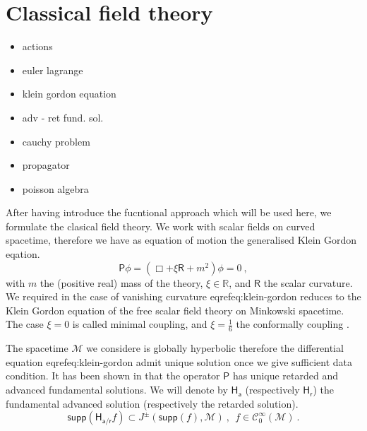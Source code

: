 \documentclass[10pt]{book}
\newcommand{\supp}{\mathsf{supp}}
\newcommand{\Ccal}{\mathcal{C}}
\newcommand{\Mcal}{\mathcal{M}}
\newcommand{\Rbb}{\mathbb{R}}
\newcommand{\Hsf}{\mathsf{H}}
\newcommand{\Psf}{\mathsf{P}}
\newcommand{\Rsf}{\mathsf{R}}
\newcommand{\asf}{\mathsf{a}}
\newcommand{\rsf}{\mathsf{r}}
\theoremstyle{break}
\begin{document}
\section{Classical field theory}

\begin{itemize}
\item actions
\item euler lagrange
\item klein gordon equation
\item adv - ret fund. sol.
\item cauchy problem
\item propagator
\item poisson algebra
\end{itemize}

\vspace*{88pt}


After having introduce the fucntional approach which will be used here, we formulate the clasical field theory. We work with scalar fields on curved spacetime, therefore we have as equation of motion the generalised Klein Gordon eqation.%
%
\begin{equation}
\Psf \phi = \left( \Box + \xi \Rsf + m^2 \right) \phi = 0 \ , 
\label{eq:klein-gordon}
\end{equation}
%
with $m$ the (positive real) mass of the theory, $\xi \in \Rbb$, and $\Rsf$ the scalar curvature. We required in the case of vanishing curvature eqref{eq:klein-gordon} reduces to the Klein Gordon equation of the free scalar field theory on Minkowski spacetime. The case $\xi=0$ is called minimal coupling, and $\xi=\frac16$ the conformally coupling \cite[Appendix D]{waldGR}.\par%


\bigskip


The spacetime $\Mcal$ we considere is globally hyperbolic therefore the differential equation eqref{eq:klein-gordon} admit unique solution once we give sufficient data condition. It has been shown in \cite[section 3]{Bar:2007zz} that the operator $\Psf$ has unique retarded and advanced fundamental solutions. We will denote by $\Hsf_\asf$ (respectively $\Hsf_\rsf$) the fundamental advanced solution (respectively the retarded solution). 
%
\begin{equation*}
\supp\left( \Hsf_{\asf/\rsf} f \right) \subset J^{\pm}\left(\supp\left(f\right),\Mcal\right) \ , \ \ f \in \Ccal^\infty_0(\Mcal) \ . 
\end{equation*}
%
\end{document}
